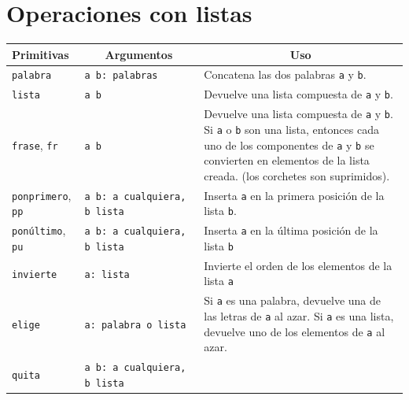 \section{Operaciones con listas}
   \label{Listas}

\begin{center} \begin{longtable}{|m{3cm}|m{4cm}|m{9cm}|} \hline 
   \multicolumn{1}{|m{3cm}|}{\textbf{Primitivas}} &
      \multicolumn{1}{c|}{\textbf{Argumentos}} &
         \multicolumn{1}{c|}{\textbf{Uso}} \\ \endhead \hline 
   \texttt{palabra} \index{palabra@\texttt{palabra}} & 
      \texttt{a b: palabras} &
        Concatena las dos palabras \texttt{a} y \texttt{b}.\\ \hline 
   \texttt{lista} \index{lista@\texttt{lista}} & \texttt{a b} &
        Devuelve una lista compuesta de \texttt{a} y \texttt{b}.\\ \hline 
   \texttt{frase}, \index{frase@\texttt{frase}} 
     \texttt{fr} \index{fr@\texttt{fr}} & \texttt{a b} &
        Devuelve una lista compuesta de \texttt{a} y \texttt{b}. Si \texttt{a}
        o \texttt{b} son una lista, entonces cada uno de los componentes de
        \texttt{a} y \texttt{b} se convierten en elementos de la lista creada.
        (los corchetes son suprimidos).\\ \hline 
   \texttt{ponprimero}, \index{ponprimero@\texttt{ponprimero}}
     \texttt{pp} \index{pp@\texttt{pp}} & 
       \texttt{a~b:~a~cualquiera, b~lista} &
        Inserta \texttt{a} en la primera posici\'on de la lista \texttt{b}.
                        \\ \hline 
   \texttt{pon\'ultimo}, \index{pon\'ultimo@\texttt{pon\'ultimo}}
     \texttt{pu} \index{pu@\texttt{pu}} & 
        \texttt{a~b:~a~cualquiera, b~lista} &
         Inserta \texttt{a} en la \'ultima posici\'on de la lista \texttt{b}
                         \\ \hline 
   \texttt{invierte} \index{invierte@\texttt{invierte}} & \texttt{a: lista} &
        Invierte el orden de los elementos de la lista \texttt{a} \\ \hline 
  \texttt{elige} \index{elige@\texttt{elige}} & \texttt{a: palabra o lista} &
        Si \texttt{a} es una palabra, devuelve una de las letras de \texttt{a}
        al azar. Si \texttt{a} es una lista, devuelve uno de los elementos
        de \texttt{a} al azar.\\ \hline 
  \texttt{quita} \index{quita@\texttt{quita}} & 
     \texttt{a~b:~a~cualquiera, b~lista} &

\end{longtable}
\end{center}
